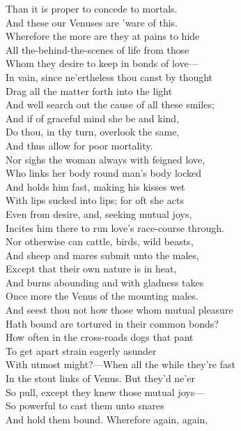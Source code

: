 Than it is proper to concede to mortals.\\
And these our Venuses are 'ware of this.\\
Wherefore the more are they at pains to hide\\
All the-behind-the-scenes of life from those\\
Whom they desire to keep in bonds of love—\\
In vain, since ne'ertheless thou canst by thought\\
Drag all the matter forth into the light\\
And well search out the cause of all these smiles;\\
And if of graceful mind she be and kind,\\
Do thou, in thy turn, overlook the same,\\
And thus allow for poor mortality.\\
Nor sighs the woman always with feigned love,\\
Who links her body round man's body locked\\
And holds him fast, making his kisses wet\\
With lips sucked into lips; for oft she acts\\
Even from desire, and, seeking mutual joys,\\
Incites him there to run love's race-course through.\\
Nor otherwise can cattle, birds, wild beasts,\\
And sheep and mares submit unto the males,\\
Except that their own nature is in heat,\\
And burns abounding and with gladness takes\\
Once more the Venus of the mounting males.\\
And seest thou not how those whom mutual pleasure\\
Hath bound are tortured in their common bonds?\\
How often in the cross-roads dogs that pant\\
To get apart strain eagerly asunder\\
With utmost might?—When all the while they're fast\\
In the stout links of Venus. But they'd ne'er\\
So pull, except they knew those mutual joys—\\
So powerful to cast them unto snares\\
And hold them bound. Wherefore again, again,\\
